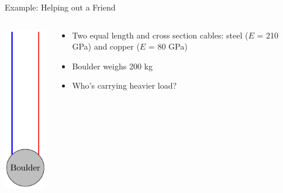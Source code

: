 \documentclass[10pt, svgnames]{beamer}
\begin{document}
\begin{frame}[label={sec:org93ecb34}]{Example: Helping out a Friend}
\begin{columns}
\begin{column}{0.3\columnwidth}
\begin{center}
\includegraphics[height=0.7\textheight]{./pictures/2-guys-one-boulder.pdf}
\end{center}
\end{column}

\begin{column}{0.7\columnwidth}
\begin{itemize}
\item Two equal length and cross section cables: steel (\(E\) = 210 GPa) and
copper (\(E\) = 80 GPa)

\item Boulder weighs 200 kg

\item Who's carrying heavier load?
\end{itemize}
\end{column}
\end{columns}
\end{frame}
\end{document}
